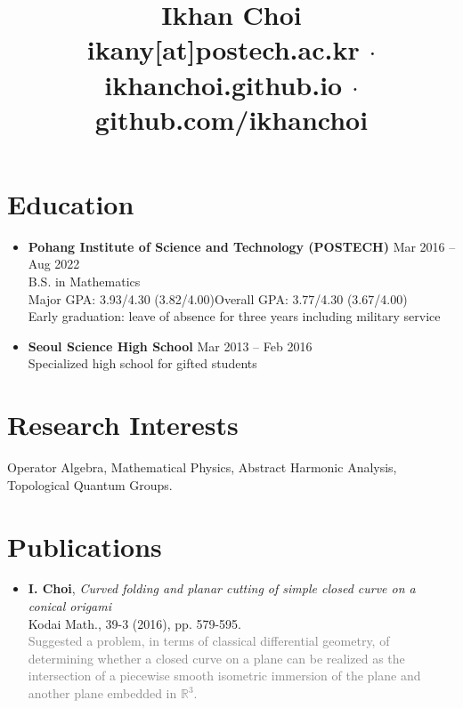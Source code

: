 \documentclass[11pt,a4paper]{article}
\title{\vspace{-40pt}
	Ikhan Choi\\[5pt]
	\small \faEnvelopeSquare\quad ikany[at]postech.ac.kr
	\quad$\cdot$\quad \faHome\quad ikhanchoi.github.io
	\quad$\cdot$\quad \faGithub\quad github.com/ikhanchoi
	\vspace{-5em}}
\date{}
\begin{document}
\maketitle


\section*{Education}
\begin{itemize}
\item
	\textbf{Pohang Institute of Science and Technology (POSTECH)}
	\hfill{\small Mar 2016 -- Aug 2022}\\
	B.S. in Mathematics\\
	Major GPA: 3.93/4.30 (3.82/4.00)\quad Overall GPA: 3.77/4.30 (3.67/4.00)\\
	Early graduation: leave of absence for three years including military service
\item
	\textbf{Seoul Science High School}
	\hfill{\small Mar 2013 -- Feb 2016}\\
	Specialized high school for gifted students
\end{itemize}



\section*{Research Interests}
\hspace{2em}
Operator Algebra, Mathematical Physics, Abstract Harmonic Analysis, Topological Quantum Groups.



\section*{Publications}
\begin{itemize}
\item
	\textbf{I. Choi},
	\emph{Curved folding and planar cutting of simple closed curve on a conical origami}\\
	Kodai Math., 39-3 (2016), pp. 579-595.\\
	\textcolor{gray}{Suggested a problem, in terms of classical differential geometry, of determining whether a closed curve on a plane can be realized as the intersection of a piecewise smooth isometric immersion of the plane and another plane embedded in $\mathbb{R}^3$.}
\end{itemize}
\end{document}
